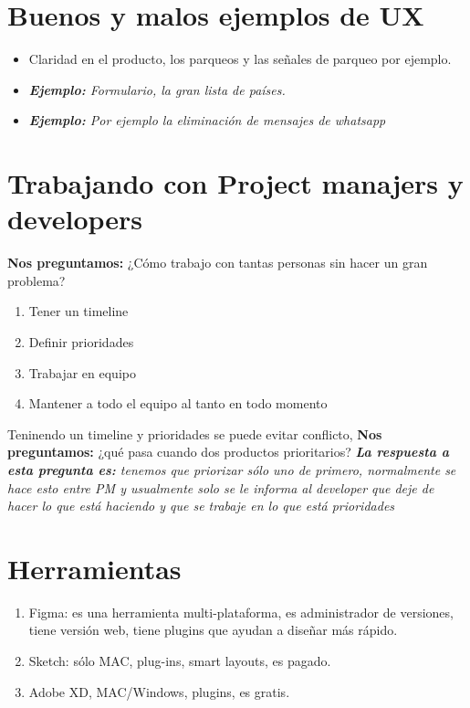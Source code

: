 \section{Buenos y malos ejemplos de UX}
\begin{itemize}
    \item Claridad en el producto, los parqueos y las señales de parqueo por ejemplo.
    \item \emph{\textbf{Ejemplo:} Formulario, la gran lista de países.}
    \item \emph{\textbf{Ejemplo:} Por ejemplo la eliminación de mensajes de whatsapp}
\end{itemize}
\section{Trabajando con Project manajers y developers}
\textbf{Nos preguntamos:} ¿Cómo trabajo con tantas personas sin hacer un gran problema?
\begin{enumerate}
    \item Tener un timeline
    \item Definir prioridades
    \item Trabajar en equipo
    \item Mantener a todo el equipo al tanto en todo momento
\end{enumerate}
Teninendo un timeline y prioridades se puede evitar conflicto, \textbf{Nos preguntamos:} ¿qué pasa cuando dos productos prioritarios? \emph{\textbf{La respuesta a esta pregunta es: }tenemos que priorizar sólo uno de primero, normalmente se hace esto entre PM y usualmente solo se le informa al developer que deje de hacer lo que está haciendo y que se trabaje en lo que está prioridades}
\section{Herramientas}
\begin{enumerate}
    \item Figma: es una herramienta multi-plataforma, es administrador de versiones, tiene versión web, tiene plugins que ayudan a diseñar más rápido.
    \item Sketch: sólo MAC, plug-ins, smart layouts, es pagado.
    \item Adobe XD, MAC/Windows, plugins, es gratis.
\end{enumerate}
